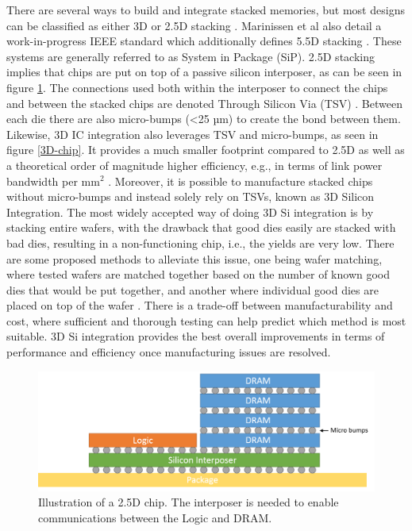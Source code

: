 There are several ways to build and integrate stacked memories, but most designs can be classified as either 3D or 2.5D stacking \cite{6248905, 5702702, 6248842}. Marinissen et al also detail a work-in-progress IEEE standard which additionally defines 5.5D stacking \cite{7519330}. These systems are generally referred to as System in Package (SiP). 2.5D stacking implies that chips are put on top of a passive silicon interposer, as can be seen in figure \ref{2D-chip}. The connections used both within the interposer to connect the chips and between the stacked chips are denoted Through Silicon Via (TSV) \cite{Lau2018, lau2012through}. Between each die there are also micro-bumps (<25 µm) to create the bond between them. Likewise, 3D IC integration also leverages TSV and micro-bumps, as seen in figure \ref{3D-chip}. It provides a much smaller footprint compared to 2.5D as well as a theoretical order of magnitude higher efficiency, e.g., in terms of link power bandwidth per mm$^{2}$ \cite{6248968}. Moreover, it is possible to manufacture stacked chips without micro-bumps and instead solely rely on TSVs, known as 3D Silicon Integration. The most widely accepted way of doing 3D Si integration is by stacking entire wafers, with the drawback that good dies easily are stacked with bad dies, resulting in a non-functioning chip, i.e., the yields are very low. There are some proposed methods to alleviate this issue, one being wafer matching, where tested wafers are matched together based on the number of known good dies that would be put together, and another where individual good dies are placed on top of the wafer \cite{Taouil:2010:TCA:1931472.1931973}. There is a trade-off between manufacturability and cost, where sufficient and thorough testing can help predict which method is most suitable. 3D Si integration provides the best overall improvements in terms of performance and efficiency once manufacturing issues are resolved.

\begin{figure}[!ht]
\centering
\includegraphics[width=0.75\linewidth]{figure/2D-integration.png}
\caption{Illustration of a 2.5D chip. The interposer is needed to enable communications between the Logic and DRAM. }
\label{2D-chip}
\end{figure}

